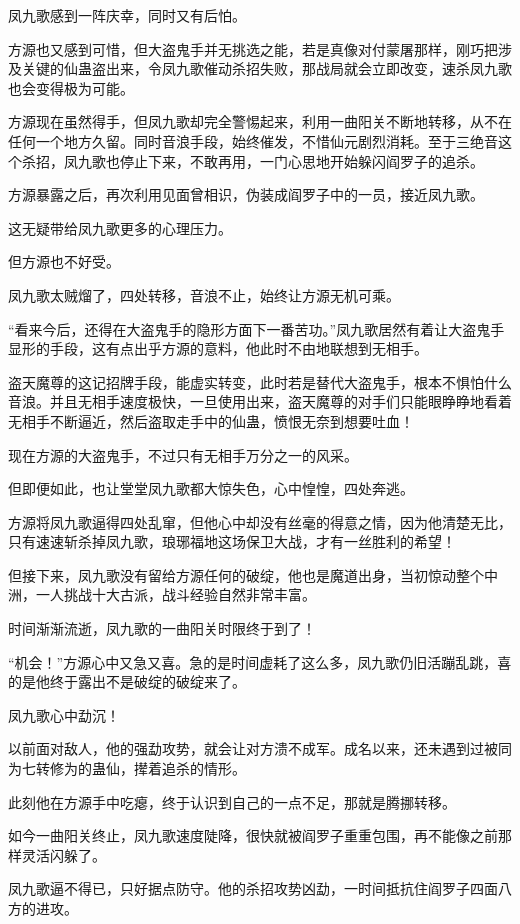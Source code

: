 \begin{this_body}
凤九歌感到一阵庆幸，同时又有后怕。

方源也又感到可惜，但大盗鬼手并无挑选之能，若是真像对付蒙屠那样，刚巧把涉及关键的仙蛊盗出来，令凤九歌催动杀招失败，那战局就会立即改变，速杀凤九歌也会变得极为可能。

方源现在虽然得手，但凤九歌却完全警惕起来，利用一曲阳关不断地转移，从不在任何一个地方久留。同时音浪手段，始终催发，不惜仙元剧烈消耗。至于三绝音这个杀招，凤九歌也停止下来，不敢再用，一门心思地开始躲闪阎罗子的追杀。

方源暴露之后，再次利用见面曾相识，伪装成阎罗子中的一员，接近凤九歌。

这无疑带给凤九歌更多的心理压力。

但方源也不好受。

凤九歌太贼熘了，四处转移，音浪不止，始终让方源无机可乘。

“看来今后，还得在大盗鬼手的隐形方面下一番苦功。”凤九歌居然有着让大盗鬼手显形的手段，这有点出乎方源的意料，他此时不由地联想到无相手。

盗天魔尊的这记招牌手段，能虚实转变，此时若是替代大盗鬼手，根本不惧怕什么音浪。并且无相手速度极快，一旦使用出来，盗天魔尊的对手们只能眼睁睁地看着无相手不断逼近，然后盗取走手中的仙蛊，愤恨无奈到想要吐血！

现在方源的大盗鬼手，不过只有无相手万分之一的风采。

但即便如此，也让堂堂凤九歌都大惊失色，心中惶惶，四处奔逃。

方源将凤九歌逼得四处乱窜，但他心中却没有丝毫的得意之情，因为他清楚无比，只有速速斩杀掉凤九歌，琅琊福地这场保卫大战，才有一丝胜利的希望！

但接下来，凤九歌没有留给方源任何的破绽，他也是魔道出身，当初惊动整个中洲，一人挑战十大古派，战斗经验自然非常丰富。

时间渐渐流逝，凤九歌的一曲阳关时限终于到了！

“机会！”方源心中又急又喜。急的是时间虚耗了这么多，凤九歌仍旧活蹦乱跳，喜的是他终于露出不是破绽的破绽来了。

凤九歌心中勐沉！

以前面对敌人，他的强勐攻势，就会让对方溃不成军。成名以来，还未遇到过被同为七转修为的蛊仙，撵着追杀的情形。

此刻他在方源手中吃瘪，终于认识到自己的一点不足，那就是腾挪转移。

如今一曲阳关终止，凤九歌速度陡降，很快就被阎罗子重重包围，再不能像之前那样灵活闪躲了。

凤九歌逼不得已，只好据点防守。他的杀招攻势凶勐，一时间抵抗住阎罗子四面八方的进攻。


\end{this_body}

